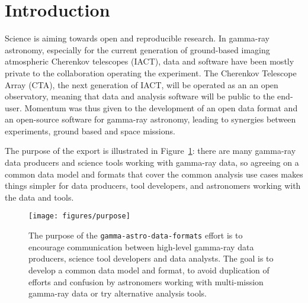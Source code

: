\section{Introduction}

Science is aiming towards open and reproducible research. In gamma-ray astronomy, especially for the current generation of ground-based imaging atmospheric Cherenkov telescopes (IACT), data and software have been mostly private to the collaboration operating the experiment. The Cherenkov Telescope Array (CTA), the next generation of IACT, will be operated as an an open observatory, meaning that data and analysis software will be public to the end-user. Momentum was thus given to the development of an open data format and an open-source software for gamma-ray astronomy, leading to synergies between experiments, ground based and space missions.

The purpose of the \gadf export is illustrated in Figure~\ref{fig:purpose}: there are many gamma-ray data producers and science tools working with gamma-ray data, so agreeing on a common data model and formats that cover the common analysis use cases makes things simpler for data producers, tool developers, and astronomers working with the data and tools.

\begin{figure}[tb]
\centerline{\texttt{[image: figures/purpose]}}
\caption{
The purpose of the \texttt{gamma-astro-data-formats} effort is to encourage communication between high-level gamma-ray data producers, science tool developers and data analysts. The goal is to develop a common data model and format, 
to avoid duplication of efforts and confusion by astronomers working with multi-mission gamma-ray data or try alternative analysis tools.
}
\label{fig:purpose}
\end{figure}

